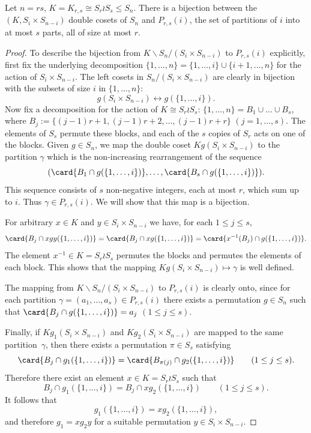 
\begin{lemma}\label{lemma:parametrization}
    Let $n = rs$, $K = K_{r,s} \cong S_r \wr S_s \le S_n$.
    There is a bijection between the $(K,S_i\times S_{n-i})$ double cosets of $S_n$ and $P_{r,s}(i)$, the set of partitions of $i$ into at most $s$ parts, all of size at most $r$. 
\end{lemma}

\begin{proof}
    To describe the bijection from $K\backslash S_n/(S_i \times S_{n-i})$ to $P_{r,s}(i)$ explicitly,
    first fix the underlying decomposition $\{1, \ldots, n\} = \{1,\ldots,i\} \cup \{i+1,\ldots, n\}$ for the action of $S_i\times S_{n-i}$. 
    The left cosets in $S_n/(S_i \times S_{n-i})$ are clearly in bijection with the subsets of size $i$ in $\{1, \ldots, n\}$:
    \[
        g(S_i \times S_{n-i}) \longleftrightarrow g(\{1, \ldots, i\}).
    \]
    Now fix a decomposition for the action of $K \cong S_r \wr S_s$: 
    $\{1, \ldots, n\} = B_1 \cup \ldots \cup B_s$,
    where $B_j := \{(j-1)r+1,(j-1)r+2,\ldots,(j-1)r+r\}$ $(j = 1,\ldots,s)$. 
    The elements of $S_s$ permute these blocks,
    and each of the $s$ copies of $S_r$ acts on one of the blocks.
    Given $g \in S_n$, we map the double coset $K g (S_i \times S_{n-i})$ to the partition $\gamma$ which is the non-increasing rearrangement of the sequence
    \[
        (\card{B_1 \cap g(\{1,\ldots,i\})}, \ldots, \card{B_s \cap g(\{1,\ldots,i\})}).
    \]
    This sequence consists of $s$ non-negative integers, each at most $r$, which sum up to $i$. Thus $\gamma \in P_{r,s}(i)$.
    We will show that this map is a bijection.

    For arbitrary $x\in K$ and $y\in S_i\times S_{n-i}$ we have,
    for each $1 \le j \le s$,
    \[
        \card{B_j \cap xgy(\{1,\ldots,i\})} 
        = \card{B_j \cap xg(\{1,\ldots,i\})}
        = \card{x^{-1}(B_j) \cap g(\{1,\ldots,i\})}.
    \]
    The element $x^{-1} \in K = S_r \wr S_s$ permutes the blocks and permutes the elements of each block. This shows that the mapping $Kg(S_i \times S_{n-i}) \mapsto \gamma$ is well defined.

    The mapping from $K\backslash S_n/(S_i \times S_{n-i})$ to $P_{r,s}(i)$ is clearly onto, since
    for each partition $\gamma = (a_1,\ldots,a_s) \in P_{r,s}(i)$ there exists a permutation $g \in S_n$ such that  $\card{B_j \cap g(\{1,\ldots,i\})} = a_j$ $(1 \le j \le s)$. 
		
    Finally, if $K g_1 (S_i \times S_{n-i})$ and $K g_2 (S_i \times S_{n-i})$ are mapped to the same partition~$\gamma$, then there exists a permutation $\pi \in S_s$ satisfying
    \[
        \card{B_j \cap g_1(\{1,\ldots,i\})}
        = \card{B_{\pi(j)} \cap g_2(\{1,\ldots,i\})}
        \qquad (1 \le j \le s).
    \]
    Therefore there exist an element $x \in K = S_r \wr S_s$ such that
    \[
        B_j \cap g_1(\{1,\ldots,i\})
        = B_j \cap xg_2(\{1,\ldots,i\})
        \qquad (1 \le j \le s).
    \]
    It follows that
    \[
        g_1(\{1,\ldots,i\}) = xg_2(\{1,\ldots,i\}),
    \]
    and therefore $g_1 = xg_2y$ for a suitable permutation $y \in S_i \times S_{n-i}$.
\end{proof}

